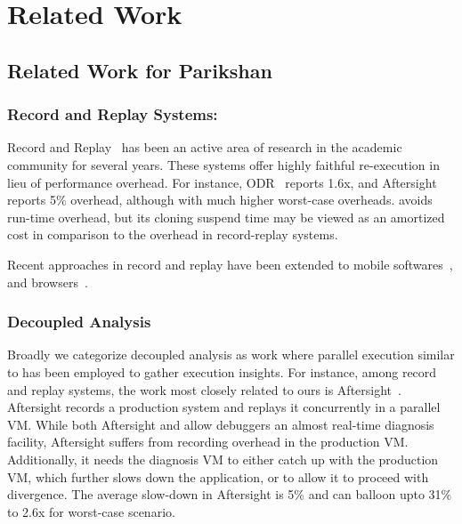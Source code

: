 \chapter{Related Work}

\section{Related Work for Parikshan}


\subsection{Record and Replay Systems:}  
Record and Replay~\cite{odr,revirt,guo2008r2,geels2007friday,doubleplay} has been an active area of research in the academic community for several years. 
These systems offer highly faithful re-execution in lieu of performance overhead. 
For instance, ODR~\cite{odr} reports 1.6x, and Aftersight~\cite{aftersight} reports 5\% overhead, although with much higher worst-case overheads.
\parikshan avoids run-time overhead, but its cloning suspend time may be viewed as an amortized cost in comparison to the overhead in record-replay systems.

Recent approaches in record and replay have been extended to mobile softwares~\cite{mobileReplay,MobiPlay}, and browsers~\cite{browserReplay}.


\subsection{Decoupled Analysis}
\label{sec:relatedDecoupled}

Broadly we categorize decoupled analysis as work where parallel execution similar to \parikshan has been employed to gather execution insights.
For instance, among record and replay systems, the work most closely related to ours is Aftersight~\cite{aftersight}. 
Aftersight records a production system and replays it concurrently in a parallel VM.
While both Aftersight and \parikshan allow debuggers an almost real-time diagnosis facility, Aftersight suffers from recording overhead in the production VM.
Additionally, it needs the diagnosis VM to either catch up with the production VM, which further slows down the application, or to allow it to proceed with divergence.
The average slow-down in Aftersight is 5\% and can balloon upto 31\% to 2.6x for worst-case scenario.


